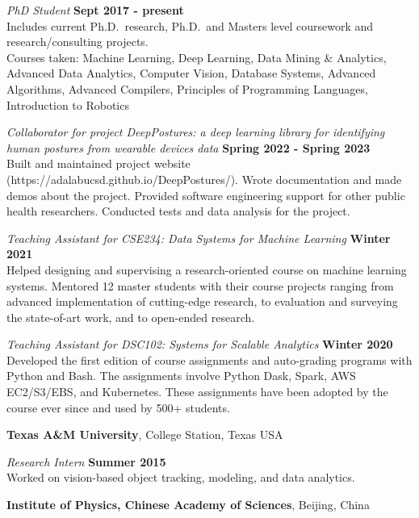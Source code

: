 \documentclass[margin,line]{res}
\begin{document}
\begin{resume}
\vspace{-.3cm}
{\em PhD Student} \hfill {\bf Sept 2017 - present}\\
Includes current Ph.D.~research, Ph.D.~and Masters level coursework and
research/consulting projects.\\
Courses taken: Machine Learning, Deep Learning, Data Mining \& Analytics, Advanced Data Analytics, Computer Vision, Database Systems, Advanced Algorithms, Advanced Compilers, Principles of Programming Languages, Introduction to Robotics

{\em Collaborator for project DeepPostures: a deep learning library for identifying human postures from wearable devices data} \hfill {\bf Spring 2022 - Spring 2023}\\
Built and maintained project website (https://adalabucsd.github.io/DeepPostures/). Wrote documentation and made demos about the project. Provided software engineering support for other public health researchers. Conducted tests and data analysis for the project. 

{\em Teaching Assistant for CSE234: Data Systems for Machine Learning} \hfill {\bf Winter 2021}\\
Helped designing and supervising a research-oriented course on machine learning systems. Mentored 12 master students with their course projects ranging from advanced implementation of cutting-edge research, to evaluation and surveying the state-of-art work, and to open-ended research. 

{\em Teaching Assistant for DSC102: Systems for Scalable Analytics} \hfill {\bf Winter 2020}\\
Developed the first edition of course assignments and auto-grading programs with Python and Bash. The assignments involve Python Dask, Spark, AWS EC2/S3/EBS, and Kubernetes. These assignments have been adopted by the course ever since and used by 500+ students.



{\bf Texas A\&M University}, College Station, Texas USA

\vspace{-.3cm}
{\em Research Intern} \hfill {\bf Summer 2015}\\
Worked on vision-based object tracking, modeling, and data analytics.

{\bf Institute of Physics, Chinese Academy of Sciences}, Beijing, China


\end{resume}
\end{document}

